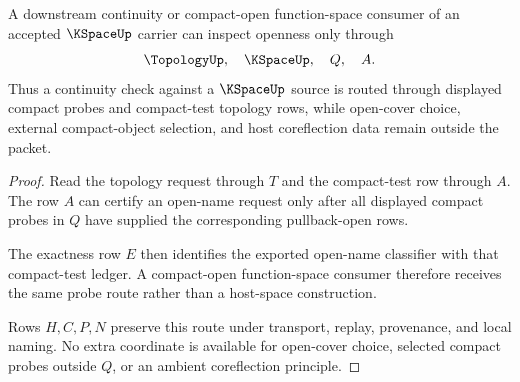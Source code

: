 \begin{theorem}
\label{thm:k-space-compact-test-continuity-handoff}
A downstream continuity or compact-open function-space consumer of an accepted $\KSpaceUp$ carrier can inspect openness only through
$$
\TopologyUp,\quad \KSpaceUp,\quad Q,\quad A .
$$
Thus a continuity check against a $\KSpaceUp$ source is routed through displayed compact probes and compact-test topology rows, while open-cover choice, external compact-object selection, and host coreflection data remain outside the packet.
\end{theorem}
\begin{proof}
Read the topology request through $T$ and the compact-test row through $A$. The row $A$ can certify an open-name request only after all displayed compact probes in $Q$ have supplied the corresponding pullback-open rows.

The exactness row $E$ then identifies the exported open-name classifier with that compact-test ledger. A compact-open function-space consumer therefore receives the same probe route rather than a host-space construction.

Rows $H,C,P,N$ preserve this route under transport, replay, provenance, and local naming. No extra coordinate is available for open-cover choice, selected compact probes outside $Q$, or an ambient coreflection principle.
\end{proof}


\begin{closurestatus}{\KSpaceUp}
  \theoryclosure{\seedClosure}
  \formalstatus{\theoremCheckedV}
\end{closurestatus}
